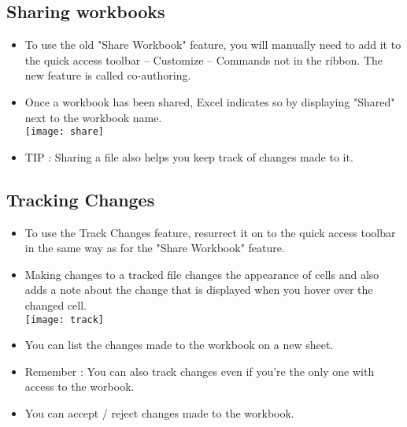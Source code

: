 \documentclass[11pt, oneside]{article}   	%
\begin{document}
\subsection{Sharing workbooks}
\begin{itemize}
\item To use the old "Share Workbook" feature, you will manually need to add it to the quick access toolbar -- Customize -- Commands not in the ribbon. The new feature is called co-authoring.
\item Once a workbook has been shared, Excel indicates so by displaying "Shared" next to the workbook name.
\bigskip\\
\texttt{[image: share]}
\bigskip\\
\item TIP : Sharing a file also helps you keep track of changes made to it.
\end{itemize}
\subsection{Tracking Changes}
\begin{itemize}
\item  To use the Track Changes feature, resurrect it on to the quick access toolbar in the same way as for the "Share Workbook" feature.
\item Making changes to a tracked file changes the appearance of cells and also adds a note about the change that is displayed when you hover over the changed cell.
\bigskip\\
\texttt{[image: track]}
\bigskip\\
\item You can list the changes made to the workbook on a new sheet.
\item Remember : You can also track changes even if you're the only one with access to the worbook.
\item You can accept / reject changes made to the workbook.
\end{itemize}
\end{document}
